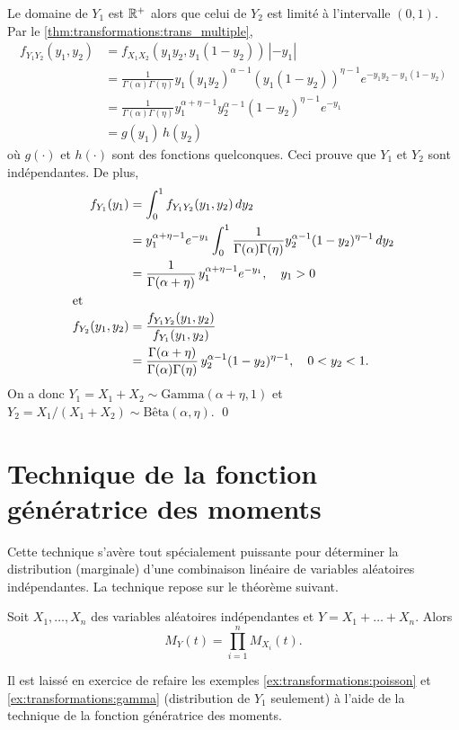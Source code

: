 \begin{exemple}
  Le domaine de $Y_1$ est $\mathbb{R}^+$ alors que celui de $Y_2$ est limité à
  l'intervalle $(0, 1)$. Par le \autoref{thm:transformations:trans_multiple},
  \begin{align*}
    f_{Y_1 Y_2}(y_1, y_2)
    &= f_{X_1 X_2}(y_1 y_2, y_1(1-y_2))\, |-y_1| \\
    &= \frac{1}{\Gamma(\alpha) \Gamma(\eta)}
    y_1 (y_1 y_2)^{\alpha - 1} (y_1 (1 - y_2))^{\eta - 1} e^{-y_1 y_2
      - y_1(1 - y_2)} \\
    &=  \frac{1}{\Gamma(\alpha) \Gamma(\eta)}
    y_1^{\alpha + \eta - 1} y_2^{\alpha - 1} (1 - y_2)^{\eta - 1}
    e^{-y_1} \\
    &= g(y_1)\, h(y_2)
  \end{align*}
  où $g(\cdot)$ et $h(\cdot)$ sont des fonctions quelconques. Ceci
  prouve que $Y_1$ et $Y_2$ sont indépendantes. De plus,
  \begin{align*}
    f_{Y_1}(y_1)
    &= \int_0^1 f_{Y_1 Y_2}(y_1, y_2)\, dy_2 \\
    &= y_1^{\alpha + \eta - 1} e^{-y_1}
    \int_0^1 \frac{1}{\Gamma(\alpha) \Gamma(\eta)}
    y_2^{\alpha - 1} (1 - y_2)^{\eta - 1}\, dy_2 \\
    &= \frac{1}{\Gamma(\alpha + \eta)}\, y_1^{\alpha + \eta - 1}
    e^{-y_1}, \quad y_1 > 0 \\
    \intertext{et}
    f_{Y_2}(y_1, y_2)
    &= \frac{f_{Y_1 Y_2}(y_1, y_2)}{f_{Y_1}(y_1, y_2)} \\
    &= \frac{\Gamma(\alpha + \eta)}{\Gamma(\alpha) \Gamma(\eta)}\,
    y_2^{\alpha - 1} (1 - y_2)^{\eta - 1}, \quad
    0 < y_2 < 1.
  \end{align*}
  On a donc $Y_1 = X_1 + X_2 \sim \text{Gamma}(\alpha + \eta, 1)$ et
  $Y_2 = X_1/(X_1 + X_2) \sim \text{Bêta}(\alpha, \eta)$. %
  \qed
\end{exemple}


\section{Technique de la fonction génératrice des moments}

Cette technique s'avère tout spécialement puissante pour déterminer la
distribution (marginale) d'une combinaison linéaire de variables
aléatoires indépendantes. La technique repose sur le théorème
suivant.

\begin{thm}
  Soit $X_1, \dots, X_n$ des variables aléatoires indépendantes et $Y
  = X_1 + \dots + X_n$. Alors
  \begin{displaymath}
    M_Y(t) = \prod_{i=1}^n M_{X_i}(t).
  \end{displaymath}
\end{thm}

Il est laissé en exercice de refaire les exemples
\ref{ex:transformations:poisson} et \ref{ex:transformations:gamma}
(distribution de $Y_1$ seulement) à l'aide de la technique de la
fonction génératrice des moments.

